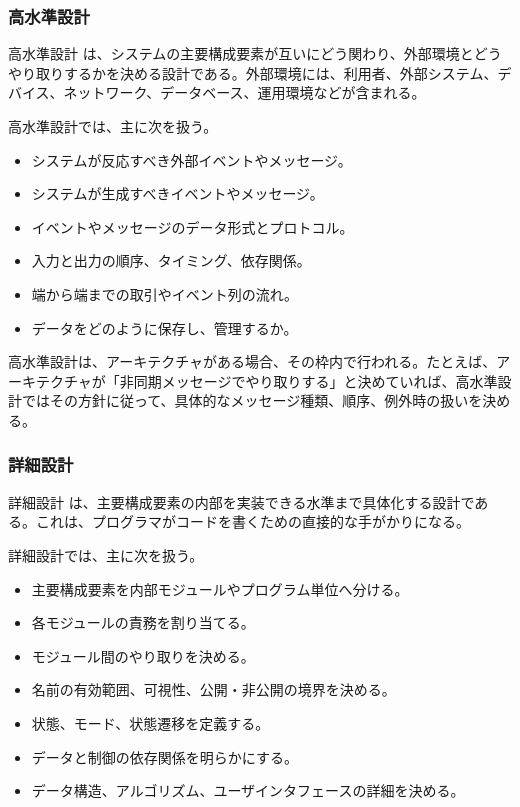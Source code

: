 \documentclass[a4paper,11pt]{ltjsarticle}
\numberwithin{figure}{section}
\numberwithin{table}{section}
\begin{document}
\subsubsection{高水準設計}

高水準設計 は、システムの主要構成要素が互いにどう関わり、外部環境とどうやり取りするかを決める設計である。外部環境には、利用者、外部システム、デバイス、ネットワーク、データベース、運用環境などが含まれる。

高水準設計では、主に次を扱う。
\begin{itemize}
  \item システムが反応すべき外部イベントやメッセージ。
  \item システムが生成すべきイベントやメッセージ。
  \item イベントやメッセージのデータ形式とプロトコル。
  \item 入力と出力の順序、タイミング、依存関係。
  \item 端から端までの取引やイベント列の流れ。
  \item データをどのように保存し、管理するか。
\end{itemize}

高水準設計は、アーキテクチャがある場合、その枠内で行われる。たとえば、アーキテクチャが「非同期メッセージでやり取りする」と決めていれば、高水準設計ではその方針に従って、具体的なメッセージ種類、順序、例外時の扱いを決める。

\subsubsection{詳細設計}

詳細設計 は、主要構成要素の内部を実装できる水準まで具体化する設計である。これは、プログラマがコードを書くための直接的な手がかりになる。

詳細設計では、主に次を扱う。
\begin{itemize}
  \item 主要構成要素を内部モジュールやプログラム単位へ分ける。
  \item 各モジュールの責務を割り当てる。
  \item モジュール間のやり取りを決める。
  \item 名前の有効範囲、可視性、公開・非公開の境界を決める。
  \item 状態、モード、状態遷移を定義する。
  \item データと制御の依存関係を明らかにする。
  \item データ構造、アルゴリズム、ユーザインタフェースの詳細を決める。
\end{itemize}
\end{document}
